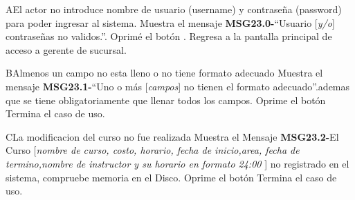 \begin{UCtrayectoriaA}{A}{El actor no introduce nombre de usuario (username) y contraseña (password) para poder ingresar al sistema.}
			\UCpaso Muestra el mensaje {\bf MSG23.0-}``Usuario [{\em y/o}] contraseñas no validos.''.
			\UCpaso[\UCactor] Oprimé el botón .
			\UCpaso Regresa a la pantalla principal de acceso a gerente de sucursal.
		\end{UCtrayectoriaA}

		\begin{UCtrayectoriaA}{B}{Almenos un campo no esta lleno o no tiene formato adecuado}
			\UCpaso Muestra el mensaje {\bf MSG23.1-}``Uno o más [{\em campos}] no tienen el formato adecuado''.ademas que se tiene obligatoriamente que llenar todos los campos.
			\UCpaso[\UCactor] Oprime el botón 
			\UCpaso[] Termina el caso de uso.
		\end{UCtrayectoriaA}
		
		\begin{UCtrayectoriaA}{C}{La modificacion del curso no fue realizada }
			\UCpaso Muestra el Mensaje {\bf MSG23.2-}El Curso [{\em nombre de curso, costo, horario, fecha de inicio,area, fecha de termino,nombre de instructor y su  horario en formato 24:00 }] no registrado en el sistema, compruebe memoria en el Disco.
			\UCpaso[\UCactor] Oprime el botón 
			\UCpaso[] Termina el caso de uso.
		\end{UCtrayectoriaA}	
